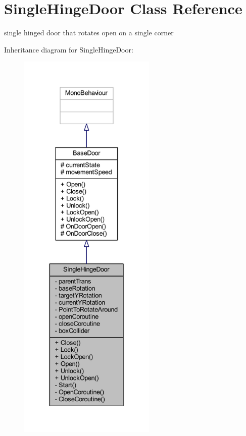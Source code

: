 \hypertarget{class_single_hinge_door}{}\section{Single\+Hinge\+Door Class Reference}
\label{class_single_hinge_door}


single hinged door that rotates open on a single corner  




Inheritance diagram for Single\+Hinge\+Door\+:\nopagebreak
\begin{figure}[H]
\begin{center}
\leavevmode
\includegraphics[height=550pt]{class_single_hinge_door__inherit__graph}
\end{center}
\end{figure}


